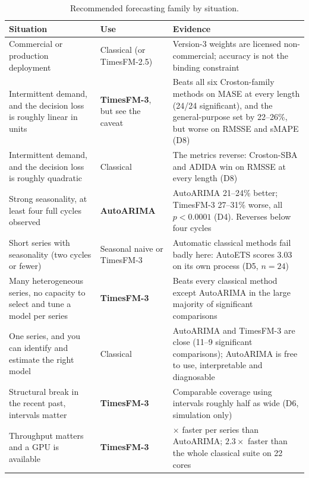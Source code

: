 \documentclass[article]{ajs}
\begin{document}
\begin{table}[!htbp]
\centering
\begin{threeparttable}
\caption{Recommended forecasting family by situation.}
\label{tab:decision}
\small
\begin{tabular}{>{\raggedright\arraybackslash}p{5.5cm}>{\raggedright\arraybackslash}p{3.0cm}>{\raggedright\arraybackslash}p{5.0cm}}
\toprule
Situation & Use & Evidence \\
\midrule
Commercial or production deployment
  & Classical (or TimesFM-2.5)
  & Version-3 weights are licensed non-commercial; accuracy is not the binding constraint \\[2pt]
Intermittent demand, and the decision loss is roughly linear in units
  & \textbf{TimesFM-3}, but see the caveat
  & Beats all six Croston-family methods on MASE at every length (24/24 significant), and the
    general-purpose set by 22--26\%, but worse on RMSSE and sMAPE (D8) \\[2pt]
Intermittent demand, and the decision loss is roughly quadratic
  & Classical
  & The metrics reverse: Croston-SBA and ADIDA win on RMSSE at every length (D8) \\[2pt]
Strong seasonality, at least four full cycles observed
  & \textbf{AutoARIMA}
  & AutoARIMA 21--24\% better; TimesFM-3 27--31\% worse, all $p < 0.0001$ (D4).
    Reverses below four cycles \\[2pt]
Short series with seasonality (two cycles or fewer)
  & Seasonal naive or TimesFM-3
  & Automatic classical methods fail badly here: AutoETS scores 3.03 on its own process (D5, $n=24$) \\[2pt]
Many heterogeneous series, no capacity to select and tune a model per series
  & \textbf{TimesFM-3}
  & Beats every classical method except AutoARIMA in the large majority of significant comparisons \\[2pt]
One series, and you can identify and estimate the right model
  & Classical
  & AutoARIMA and TimesFM-3 are close (11--9 significant comparisons); AutoARIMA is free to use, interpretable and diagnosable \\[2pt]
Structural break in the recent past, intervals matter
  & \textbf{TimesFM-3}
  & Comparable coverage using intervals roughly half as wide (D6, simulation only) \\[2pt]
Throughput matters and a GPU is available
  & \textbf{TimesFM-3}
  & 103$\times$ faster per series than AutoARIMA; $2.3\times$ faster than the whole
    classical suite on 22 cores \\[2pt]

\end{tabular}
\end{threeparttable}
\end{table}
\end{document}
